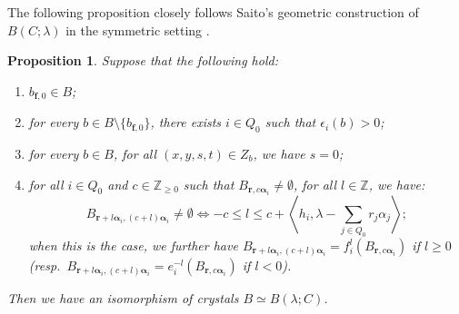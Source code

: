 \documentclass[a4paper,12pt]{article}
\theoremstyle{definition}
\theoremstyle{plain}
\newtheorem{proposition}[definition]{Proposition}
\theoremstyle{remark}
\newcommand\bbZ{\mathbb{Z}}
\newcommand\bfalpha{\bm{\alpha}}
\newcommand\bff{\mathbf{f}}
\newcommand\bfr{\mathbf{r}}
\begin{document}
The following proposition closely follows Saito's geometric construction of $B(C;\lambda)$ in the symmetric setting \cite{Sai02}.

\begin{proposition}\label{Prop/geometricCriteriaB(lambda)}
Suppose that the following hold:
\begin{enumerate}[label=(\arabic*)]
\item\label{Item1/Prop/geometricCriteriaB(lambda)} $b_{\bff,0}\in B$;
\item\label{Item2/Prop/geometricCriteriaB(lambda)} for every $b\in B\setminus\{b_{\bff,0}\}$, there exists $i\in Q_0$ such that $\epsilon_i(b)>0$;
\item\label{Item3/Prop/geometricCriteriaB(lambda)} for every $b\in B$, for all $(x,y,s,t)\in Z_b$, we have $s=0$;
\item\label{Item4/Prop/geometricCriteriaB(lambda)} for all $i\in Q_0$ and $c\in\bbZ_{\geq0}$ such that $B_{\bfr,c\bfalpha_i}\ne\emptyset$, for all $l\in\bbZ$, we have:
\[
B_{\bfr+l\bfalpha_i,(c+l)\bfalpha_i}\ne\emptyset
\Leftrightarrow
-c\leq l\leq c+\left\langle h_i,\lambda-\sum_{j\in Q_0}r_j\alpha_j\right\rangle
;
\]
when this is the case, we further have $B_{\bfr+l\bfalpha_i,(c+l)\bfalpha_i}=f_i^l(B_{\bfr,c\bfalpha_i})$ if $l\geq0$ (resp.\ $B_{\bfr+l\bfalpha_i,(c+l)\bfalpha_i}=e_i^{-l}(B_{\bfr,c\bfalpha_i})$ if $l<0$).
\end{enumerate}
Then we have an isomorphism of crystals $B\simeq B(\lambda;C)$.
\end{proposition}
\end{document}
